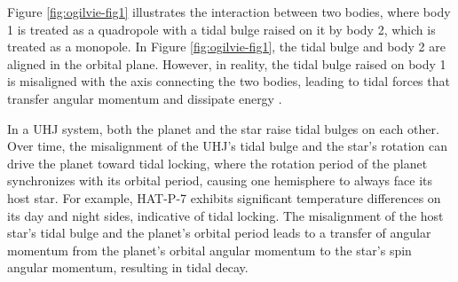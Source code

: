 \documentclass[oneside,12pt]{amsart}
\numberwithin{page}{section}
\begin{document}

Figure \ref{fig:ogilvie-fig1} illustrates the interaction between two bodies, where body 1 is treated as a quadropole with a tidal bulge raised on it by body 2, which is treated as a monopole. In Figure \ref{fig:ogilvie-fig1}, the tidal bulge and body 2 are aligned in the orbital plane. However, in reality, the tidal bulge raised on body 1 is misaligned with the axis connecting the two bodies, leading to tidal forces that transfer angular momentum and dissipate energy \citep{ogilvie2014tidal}.

In a UHJ system, both the planet and the star raise tidal bulges on each other. Over time, the misalignment of the UHJ's tidal bulge and the star's rotation can drive the planet toward tidal locking, where the rotation period of the planet synchronizes with its orbital period, causing one hemisphere to always face its host star. For example, HAT-P-7 \citep{helling2019understanding} exhibits significant temperature differences on its day and night sides, indicative of tidal locking. The misalignment of the host star's tidal bulge and the planet's orbital period leads to a transfer of angular momentum from the planet's orbital angular momentum to the star's spin angular momentum, resulting in tidal decay.

\end{document}
